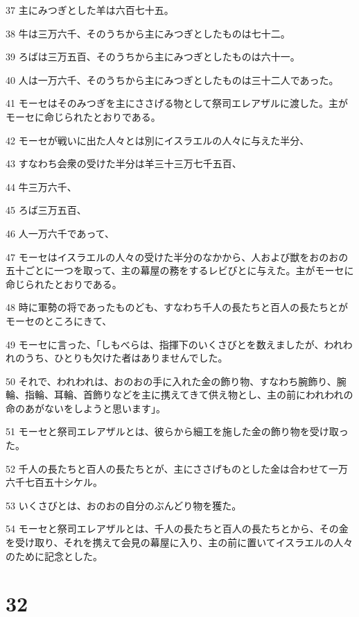 \par 37 主にみつぎとした羊は六百七十五。
\par 38 牛は三万六千、そのうちから主にみつぎとしたものは七十二。
\par 39 ろばは三万五百、そのうちから主にみつぎとしたものは六十一。
\par 40 人は一万六千、そのうちから主にみつぎとしたものは三十二人であった。
\par 41 モーセはそのみつぎを主にささげる物として祭司エレアザルに渡した。主がモーセに命じられたとおりである。
\par 42 モーセが戦いに出た人々とは別にイスラエルの人々に与えた半分、
\par 43 すなわち会衆の受けた半分は羊三十三万七千五百、
\par 44 牛三万六千、
\par 45 ろば三万五百、
\par 46 人一万六千であって、
\par 47 モーセはイスラエルの人々の受けた半分のなかから、人および獣をおのおの五十ごとに一つを取って、主の幕屋の務をするレビびとに与えた。主がモーセに命じられたとおりである。
\par 48 時に軍勢の将であったものども、すなわち千人の長たちと百人の長たちとがモーセのところにきて、
\par 49 モーセに言った、「しもべらは、指揮下のいくさびとを数えましたが、われわれのうち、ひとりも欠けた者はありませんでした。
\par 50 それで、われわれは、おのおの手に入れた金の飾り物、すなわち腕飾り、腕輪、指輪、耳輪、首飾りなどを主に携えてきて供え物とし、主の前にわれわれの命のあがないをしようと思います」。
\par 51 モーセと祭司エレアザルとは、彼らから細工を施した金の飾り物を受け取った。
\par 52 千人の長たちと百人の長たちとが、主にささげものとした金は合わせて一万六千七百五十シケル。
\par 53 いくさびとは、おのおの自分のぶんどり物を獲た。
\par 54 モーセと祭司エレアザルとは、千人の長たちと百人の長たちとから、その金を受け取り、それを携えて会見の幕屋に入り、主の前に置いてイスラエルの人々のために記念とした。

\chapter{32}

